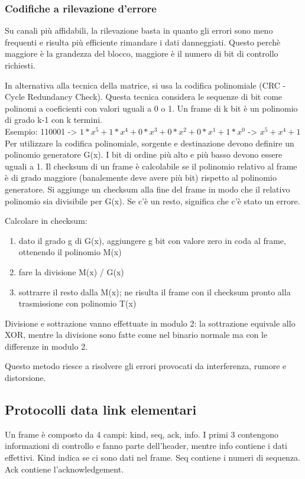 \subsubsection{Codifiche a rilevazione d'errore}
Su canali più affidabili, la rilevazione basta in quanto gli errori sono meno frequenti e risulta più efficiente rimandare i dati danneggiati.
Questo perchè maggiore è la grandezza del blocco, maggiore è il numero di bit di controllo richiesti.

In alternativa alla tecnica della matrice, si usa la codifica polinomiale (CRC - Cycle Redundancy Check).
Questa tecnica considera le sequenze di bit come polinomi a coeficienti con valori uguali a 0 o 1.
Un frame di k bit è un polinomio di grado k-1 con k termini.\\
Esempio: 110001 -> $1*x^5+1*x^4+0*x^3+0*x^2+0*x^1+1*x^0$ -> $x^5+x^4+1$\\

Per utilizzare la codifica polinomiale, sorgente e destinazione devono definire un polinomio generatore G(x).
I bit di ordine più alto e più basso devono essere uguali a 1.
Il checksum di un frame è calcolabile se il polinomio relativo al frame è di grado maggiore (banalemente deve avere più bit) rispetto al polinomio generatore.
Si aggiunge un checksum alla fine del frame in modo che il relativo polinomio sia divisibile per G(x).
Se c'è un resto, significa che c'è stato un errore.

Calcolare in checksum:
\begin{enumerate}
    \item dato il grado g di G(x), aggiungere g bit con valore zero in coda al frame, ottenendo il polinomio M(x)
    \item fare la divisione M(x) / G(x)
    \item sottrarre il resto dalla M(x); ne risulta il frame con il checksum pronto alla trasmissione con polinomio T(x)
\end{enumerate}
Divisione e sottrazione vanno effettuate in modulo 2: la sottrazione equivale allo XOR, mentre la divisione sono fatte come nel binario normale ma con le differenze in modulo 2.

Questo metodo riesce a risolvere gli errori provocati da interferenza, rumore e distorsione.

\subsection{Protocolli data link elementari} %
Un frame è composto da 4 campi: kind, seq, ack, info.
I primi 3 contengono informazioni di controllo e fanno parte dell'header, mentre info contiene i dati effettivi.
Kind indica se ci sono dati nel frame. Seq contiene i numeri di sequenza. Ack contiene l'acknowledgement.

